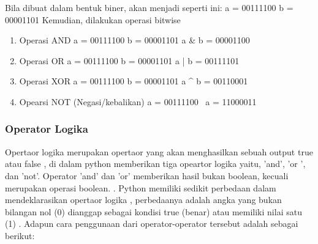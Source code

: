 \begin{eqation}
Bila dibuat dalam bentuk biner, akan menjadi seperti ini:
a = 00111100
b = 00001101
Kemudian, dilakukan operasi bitwise

\begin{enumerate}
\item Operasi AND
      a = 00111100
      b = 00001101
      a & b = 00001100
      
\item Operasi OR
      a = 00111100
      b = 00001101
      a | b = 00111101

\item Operasi XOR
      a = 00111100
      b = 00001101
      a ^ b = 00110001

\item Opearsi NOT (Negasi/kebalikan)
      a = 00111100
      ~a  = 11000011
      
\end{enumerate}


\subsubsection{Operator Logika}
Opertaor logika merupakan opertaor yang akan menghasilkan sebuah output true atau false , di dalam python memberikan tiga opeartor logika yaitu, 'and', 'or ', dan 'not'. Operator 'and' dan 'or' memberikan hasil bukan boolean, kecuali merupakan operasi boolean. . Python memiliki sedikit perbedaan dalam mendeklarasikan opertaor logika , perbedaanya adalah angka yang bukan bilangan nol (0) dianggap sebagai kondisi true (benar) atau memiliki nilai satu (1) .
Adapun cara penggunaan dari operator-operator tersebut adalah sebagai berikut:

\end{eqation}
